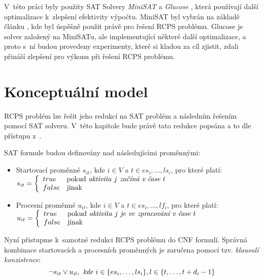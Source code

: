 \documentclass[a4paper, 12pt]{article}
\begin{document}
V~této práci byly použity SAT Solvery \emph{MiniSAT} \cite{www:minisat} a \emph{Glucose} \cite{www:glucose}, která
používají další optimalizace k~zlepšení efektivity výpočtu.
MiniSAT byl vybrán na základě článku \cite{horbach:10}, kde byl úspěšně použit právě pro řešení RCPS problému.
Glucose je solver založený na MiniSATu, ale implementující některé další optimalizace, a proto s~ní budou provedeny
experimenty, které si kladou za cíl zjistit, zdali přináší zlepšení pro výkonu při řešení RCPS problému.

\section{Konceptuální model}
\label{sec:concept}
RCPS problém lze řešit jeho redukcí na SAT problém a následním řešením pomocí SAT solveru.
V~této kapitole bude právě tato redukce popsána a to dle přístupu z~\cite{horbach:10}.

SAT formule budou definovány nad následujícími proměnnými:
\begin{itemize}
    \item Startovací proměnné $s_{it}$, kde $i\in V$ a $t\in{es_i,\ldots,ls_i}$, pro které platí: \newline 
    $s_{it}=
        \left\{
        \begin{array}{ll}
             true & \mbox{pokud} \emph{ aktivita }j \emph{ začíná v~čase }t \\
             false & \mbox{jinak}\\
        \end{array}
        \right.
        $
    \item Procesní proměnné $u_{it}$, kde $i \in V$ a $t \in {es_i,\ldots, lf_i}$, pro které platí: \newline
    $u_{it}=
        \left\{
        \begin{array}{ll}
             true & \mbox{pokud} \emph{ aktivita }j \emph{ je ve zpracování  v~čase }t \\
             false & \mbox{jinak}\\
        \end{array}
        \right.
        $
\end{itemize}

Nyní přistupme k~samotné redukci RCPS problému do CNF formulí.
Správná kombinace startovacích a procesních proměnných je zaručena pomocí tzv. \emph{klausulí konzistence}:
\begin{equation}
\label{eq:1}
   \neg s_{it} \vee u_{il},\emph{ kde } i\in\{es_i,\ldots,ls_i\}, l\in\{t,\ldots,t+d_i-1\}  
\end{equation}
\end{document}

